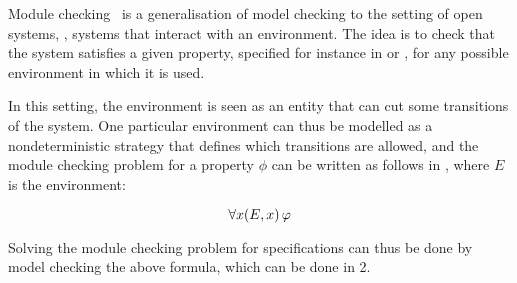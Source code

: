 Module checking~\cite{kupferman2001module} is a generalisation of model checking to the setting
of open systems, \ie, systems that interact with an environment. The
idea is to check that the system satisfies a given property, specified
for instance in \LTL or \CTLs, for any possible environment in which
it is used.

In this setting, the environment is seen as an entity that can cut
some transitions of the system. One particular environment can thus be
modelled as a nondeterministic strategy that defines which transitions
are allowed, and the module checking problem for a property $\phi$ can
be written as follows in \SLref, where $E$ is the environment:

\[\forall x (E,x) \,\varphi\]

Solving the module checking problem for \CTLs specifications can thus
be done by model checking the above \SLref formula, which can be done
in 2\EXPTIME.


